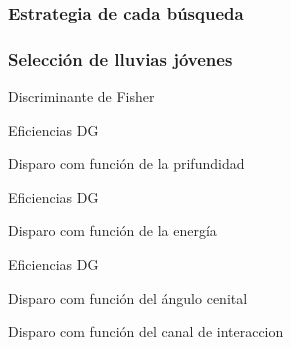 \begin{frame}
 \frametitle{Estrategia de cada b\'usqueda}
 \begin{center}
 \end{center}
\end{frame}


\begin{frame}
 \frametitle{Selecci\'on de lluvias j\'ovenes}
 \begin{block}{Discriminante de Fisher}
 \centering
 \end{block}
\end{frame}

\begin{frame}{Eficiencias DG}
	\begin{block}{Disparo com funci\'on de la prifundidad}
		\begin{center}
		\end{center}
	\end{block}
\end{frame}

\begin{frame}{Eficiencias DG}
	\begin{block}{Disparo com funci\'on de la energ\'ia}
		\begin{center}
		\end{center}
	\end{block}
\end{frame}

\begin{frame}{Eficiencias DG}
\footnotesize
	\begin{block}{Disparo com funci\'on del \'angulo cenital}
		\begin{center}
		\hspace{3mm}
		\end{center}
	\end{block}
% 
	\begin{block}{Disparo com funci\'on del canal de interaccion}
		\begin{center}
		\hspace{3mm}
		\end{center}
	\end{block}
\end{frame}

